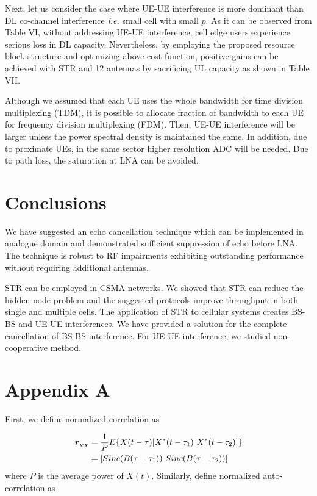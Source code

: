 \documentclass[twocolumn]{IEEEtran}
\begin{document}
Next, let us consider the case where UE-UE interference is more
dominant than DL co-channel interference \emph{i.e.} small cell with
small $p$. As it can be observed from Table VI, without addressing
UE-UE interference, cell edge users experience serious loss in DL
capacity. Nevertheless, by employing the proposed resource block
structure and optimizing above cost function, positive gains can be
achieved with STR and 12 antennas by sacrificing UL capacity as
shown in Table VII.


Although we assumed that each UE uses the whole bandwidth for time
division multiplexing (TDM), it is possible to allocate fraction of
bandwidth to each UE for frequency division multiplexing (FDM).
Then, UE-UE interference will be larger unless the power spectral
density is maintained the same. In addition, due to proximate UEs,
in the same sector higher resolution ADC will be needed. Due to path
loss, the saturation at LNA can be avoided.



\section{Conclusions}

We have suggested an echo cancellation technique which can be
implemented in analogue domain and demonstrated sufficient
suppression of echo before LNA. The technique is robust to RF
impairments exhibiting outstanding performance without requiring
additional antennas.

STR can be employed in CSMA networks. We showed that STR can reduce
the hidden node problem and the suggested protocols improve
throughput in both single and multiple cells. The application of STR
to cellular systems creates BS-BS and UE-UE interferences. We have
provided a solution for the complete cancellation of BS-BS
interference. For UE-UE interference, we studied non-cooperative
method.



\section*{Appendix A}

\setcounter{equation}{0}
\renewcommand{\theequation}{A.\arabic{equation}}

First, we define normalized correlation as

\begin{align}
\textbf{\textit{r}}_{{}_{Y\textbf{\textit{X}}}}&=\frac{1}{P}E\{
X(t-\tau) [X^*(t-\tau_1)~
X^*(t-\tau_2)]\} \nonumber\\
&=[Sinc(B(\tau-\tau_1))~Sinc(B(\tau-\tau_2))]
\end{align}
where $P$ is the average power of $X(t)$. Similarly, define
normalized auto-correlation as
\end{document}
